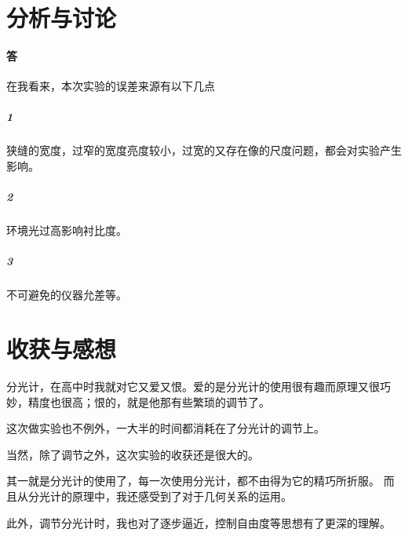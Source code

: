 \documentclass{ctexart}
\begin{document}
  
\section{分析与讨论}
\paragraph{答}在我看来，本次实验的误差来源有以下几点
\subparagraph{1}狭缝的宽度，过窄的宽度亮度较小，过宽的又存在像的尺度问题，都会对实验产生影响。
\subparagraph{2}环境光过高影响衬比度。
\subparagraph{3}不可避免的仪器允差等。
\section{收获与感想}
分光计，在高中时我就对它又爱又恨。爱的是分光计的使用很有趣而原理又很巧妙，精度也很高；恨的，就是他那有些繁琐的调节了。

这次做实验也不例外，一大半的时间都消耗在了分光计的调节上。

当然，除了调节之外，这次实验的收获还是很大的。

其一就是分光计的使用了，每一次使用分光计，都不由得为它的精巧所折服。
而且从分光计的原理中，我还感受到了对于几何关系的运用。

此外，调节分光计时，我也对了逐步逼近，控制自由度等思想有了更深的理解。
\end{document}
